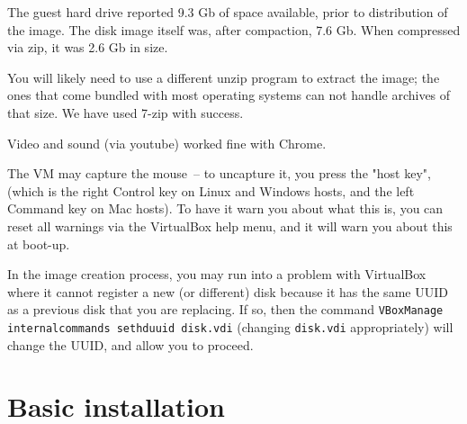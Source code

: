 \begin{itemlist}
\item The guest hard drive reported 9.3 Gb of space available, prior
  to distribution of the image.  The disk image itself was, after
  compaction, 7.6 Gb.  When compressed via zip, it was 2.6 Gb in size.
\item You will likely need to use a different unzip program to extract
  the image; the ones that come bundled with most operating systems
  can not handle archives of that size.  We have used
  7-zip with success.
\item Video and sound (via youtube) worked fine with Chrome.
\item The VM may capture the mouse~-- to uncapture it, you press the
  "host key", (which is the right Control key on Linux and Windows
  hosts, and the left Command key on Mac hosts).  To have it warn you
  about what this is, you can reset all warnings via the VirtualBox
  help menu, and it will warn you about this at boot-up.
\item In the image creation process, you may run into a problem with
  VirtualBox where it cannot register a new (or different) disk
  because it has the same UUID as a previous disk that you are
  replacing.  If so, then the command {\tt VBoxManage internalcommands
  sethduuid disk.vdi} (changing {\tt disk.vdi} appropriately) will change
  the UUID, and allow you to proceed.
\end{itemlist}


\section{Basic installation}

